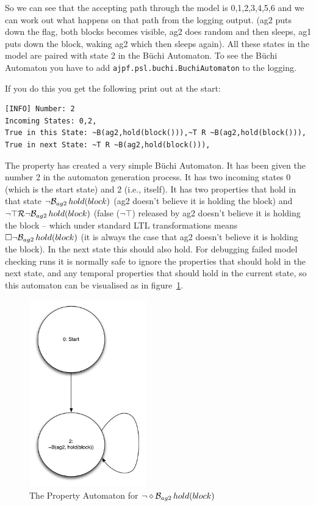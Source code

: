 So we can see that the accepting path through the model is 0,1,2,3,4,5,6 and we can work out what happens on that path from the logging output.  (ag2 puts down the flag, both blocks becomes visible, ag2 does random and then sleeps, ag1 puts down the block, waking ag2 which then sleeps again).  All these states in the model are paired with state 2 in the B\"{u}chi Automaton.  To see the B\"{u}chi Automaton you have to add \texttt{ajpf.psl.buchi.BuchiAutomaton} to the logging.

If you do this you get the following print out at the start:

\begin{verbatim}
[INFO] Number: 2
Incoming States: 0,2,
True in this State: ~B(ag2,hold(block())),~T R ~B(ag2,hold(block())),
True in next State: ~T R ~B(ag2,hold(block())),
\end{verbatim}

The property has created a very simple B\"{u}chi Automaton.  It has been given the number 2 in the automaton generation process.  It has two incoming states 0 (which is the start state) and 2 (i.e., itself).  It has two properties that hold in that state $\neg \mathrm{{\cal B}}_{ag2} \, hold(block)$ (ag2 doesn't believe it is holding the block) and $\neg \top {\cal R} \neg \mathrm{{\cal B}}_{ag2} \, hold(block)$ (false ($\neg \top$) released by ag2 doesn't believe it is holding the block -- which under standard LTL transformations means $\Box \neg \mathrm{{\cal B}}_{ag2} \, hold(block)$ (it is always the case that ag2 doesn't believe it is holding the block).  In the next state this should also hold.  For debugging failed model checking runs it is normally safe to ignore the properties that should hold in the next state, and any temporal properties that should hold in the current state, so this automaton can be visualised as in figure~\ref{fig:automaton}.

\begin{figure}[htb]
\begin{center}
\includegraphics[width=2in]{images/property_automata.pdf}
\end{center}
\caption{The Property Automaton for $\neg \diamond \mathrm{{\cal B}}_{ag2} \, hold(block)$}
\label{fig:automaton}
\end{figure}

